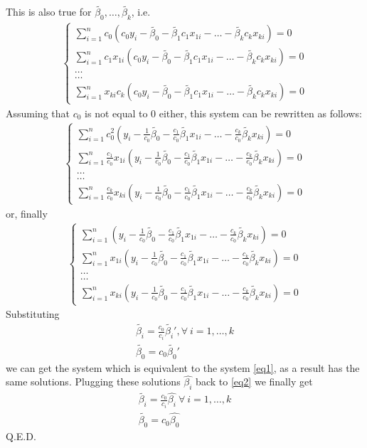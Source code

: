 \documentclass[a4paper]{article}
\newcommand{\summa}{\sum_{i=1}^n}
\begin{document}
This is also true for $\tilde{\beta_0}, \dots, \tilde{\beta_k}$, i.e.
\begin{align*}
\begin{cases}
\summa c_0(c_0y_i - \tilde{\beta_0} - \tilde{\beta_1}c_1x_{1i} - \dots - \tilde{\beta_k}c_kx_{ki}) = 0\\
\summa c_1x_{1i}(c_0y_i - \tilde{\beta_0} - \tilde{\beta_1}c_1x_{1i} - \dots - \tilde{\beta_k}c_kx_{ki}) = 0\\
\dots\\
\dots\\
\summa x_{ki}c_k(c_0y_i - \tilde{\beta_0} - \tilde{\beta_1}c_1x_{1i} - \dots - \tilde{\beta_k}c_kx_{ki}) = 0
\end{cases}
\end{align*}
Assuming that $c_0$ is not equal to 0 either, this system can be rewritten as follows:
\begin{align*}
\begin{cases}
\summa c_0^2(y_i - \frac{1}{c_0}\tilde{\beta_0} - \frac{c_1}{c_0}\tilde{\beta_1}x_{1i} - \dots - \frac{c_k}{c_0}\tilde{\beta_k}x_{ki}) = 0\\
\summa \frac{c_1}{c_0}x_{1i}(y_i - \frac{1}{c_0}\tilde{\beta_0} - \frac{c_1}{c_0}\tilde{\beta_1}x_{1i} - \dots - \frac{c_k}{c_0}\tilde{\beta_k}x_{ki}) = 0\\
\dots\\
\dots\\
\summa \frac{c_k}{c_0}x_{ki}(y_i - \frac{1}{c_0}\tilde{\beta_0} - \frac{c_1}{c_0}\tilde{\beta_1}x_{1i} - \dots - \frac{c_k}{c_0}\tilde{\beta_k}x_{ki}) = 0
\end{cases}
\end{align*}
or, finally
\begin{align*}
\begin{cases}
\summa (y_i - \frac{1}{c_0}\tilde{\beta_0} - \frac{c_1}{c_0}\tilde{\beta_1}x_{1i} - \dots - \frac{c_k}{c_0}\tilde{\beta_k}x_{ki}) = 0\\
\summa x_{1i}(y_i - \frac{1}{c_0}\tilde{\beta_0} - \frac{c_1}{c_0}\tilde{\beta_1}x_{1i} - \dots - \frac{c_k}{c_0}\tilde{\beta_k}x_{ki}) = 0\\
\dots\\
\dots\\
\summa x_{ki}(y_i - \frac{1}{c_0}\tilde{\beta_0} - \frac{c_1}{c_0}\tilde{\beta_1}x_{1i} - \dots - \frac{c_k}{c_0}\tilde{\beta_k}x_{ki}) = 0
\end{cases}
\end{align*}
Substituting 
\begin{align}\label{eq2}
\tilde{\beta_i} = \frac{c_0}{c_i}\tilde{\beta_i}', \forall\ i = 1, \dots, k\\
\tilde{\beta_0} = c_0 \tilde{\beta_0}' \nonumber
\end{align} 
we can get the system which is equivalent to the system \eqref{eq1}, as a result has the same solutions. Plugging these solutions $\hat{\beta_i}$ back to \eqref{eq2} we finally get
\begin{align*}
\tilde{\beta_i} = \frac{c_0}{c_i}\hat{\beta_i}\ \forall\ i=1, \dots, k\\
\tilde{\beta_0} = c_0 \hat{\beta_0}
\end{align*}
Q.E.D.
\end{document}
